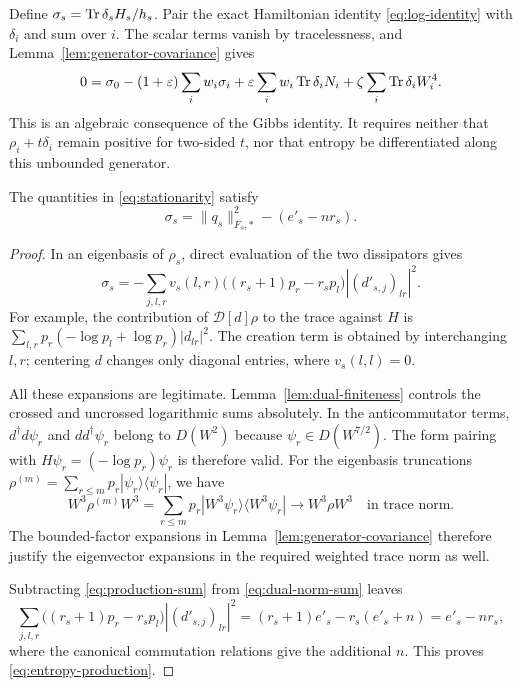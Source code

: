 Define $\sigma_s=\operatorname{Tr}\delta_sH_s/h_s$.  Pair the exact Hamiltonian identity
\eqref{eq:log-identity} with $\delta_i$ and sum over $i$.  The scalar terms
vanish by tracelessness, and Lemma~\ref{lem:generator-covariance} gives
\begin{equation}\label{eq:stationarity}
 0=\sigma_0-(1+\varepsilon)\sum_iw_i\sigma_i
       +\varepsilon\sum_iw_i\operatorname{Tr}\delta_iN_i
       +\zeta\sum_i\operatorname{Tr}\delta_iW_i^4.
\end{equation}
This is an algebraic consequence of the Gibbs identity.  It requires
neither that $\rho_i+t\delta_i$ remain positive for two-sided $t$, nor
that entropy be differentiated along this unbounded generator.

\begin{lemma}\label{lem:entropy-production}
The quantities in \eqref{eq:stationarity} satisfy
\begin{equation}\label{eq:entropy-production}
 \sigma_s=\|q_s\|_{F_s,*}^2-(e'_s-nr_s).
\end{equation}
\end{lemma}

\begin{proof}
In an eigenbasis of $\rho_s$, direct evaluation of the two dissipators
gives
\begin{equation}\label{eq:production-sum}
 \sigma_s=-\sum_{j,l,r}v_s(l,r)
       \bigl((r_s+1)p_r-r_sp_l\bigr)|(d'_{s,j})_{lr}|^2.
\end{equation}
For example, the contribution of $\mathcal D[d]\rho$ to the trace
against $H$ is
$\sum_{l,r}p_r(-\log p_l+\log p_r)|d_{lr}|^2$.
The creation term is obtained by interchanging $l,r$; centering $d$
changes only diagonal entries, where $v_s(l,l)=0$.

All these expansions are legitimate.  Lemma~\ref{lem:dual-finiteness}
controls the crossed and uncrossed logarithmic sums absolutely.  In the
anticommutator terms, $d^\dagger d\psi_r$ and $dd^\dagger\psi_r$ belong
to $D(W^2)$ because $\psi_r\in D(W^{7/2})$.  The form pairing with
$H\psi_r=(-\log p_r)\psi_r$ is therefore valid.  For the eigenbasis truncations $\rho^{(m)}=\sum_{r\le m}p_r
|\psi_r\rangle\langle\psi_r|$, we have
\[
 W^3\rho^{(m)}W^3=\sum_{r\le m}p_r
 |W^3\psi_r\rangle\langle W^3\psi_r|
 \longrightarrow W^3\rho W^3
 \quad\text{in trace norm}.
\]
The bounded-factor expansions in
Lemma~\ref{lem:generator-covariance} therefore justify the eigenvector
expansions in the required weighted trace norm as well.

Subtracting \eqref{eq:production-sum} from
\eqref{eq:dual-norm-sum} leaves
\[
 \sum_{j,l,r}\bigl((r_s+1)p_r-r_sp_l\bigr)|(d'_{s,j})_{lr}|^2
 =(r_s+1)e'_s-r_s(e'_s+n)=e'_s-nr_s,
\]
where the canonical commutation relations give the additional $n$.
This proves \eqref{eq:entropy-production}.
\end{proof}

